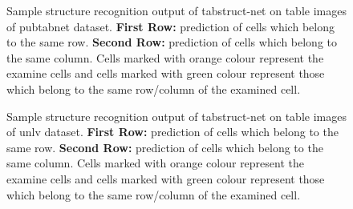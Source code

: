 \documentclass[runningheads]{llncs}
\begin{document}
\begin{figure}
\begin{center}
\hspace{-0.01\textwidth}
\hspace{-0.01\textwidth}
\vspace{0.001\textwidth}
\hspace{-0.01\textwidth}
\hspace{-0.01\textwidth}
\end{center}
\caption{Sample structure recognition output of {\sc t}ab{\sc s}truct-{\sc n}et on table images of {\sc p}ub{\sc t}ab{\sc n}et dataset. \textbf{First Row:} prediction of cells which belong to the same row. \textbf{Second Row:} prediction of cells which belong to the same column. Cells marked with orange colour represent the examine cells and cells marked with green colour represent those which belong to the same row/column of the examined cell.}
\label{fig_pubtabnet_structure}
\end{figure}
\begin{figure}
\begin{center}
\hspace{-0.01\textwidth}
\hspace{-0.01\textwidth}
\vspace{0.001\textwidth}
\hspace{-0.01\textwidth}
\hspace{-0.01\textwidth}
\end{center}
\caption{Sample structure recognition output of {\sc t}ab{\sc s}truct-{\sc n}et on table images of {\sc unlv} dataset. \textbf{First Row:} prediction of cells which belong to the same row. \textbf{Second Row:} prediction of cells which belong to the same column. Cells marked with orange colour represent the examine cells and cells marked with green colour represent those which belong to the same row/column of the examined cell.}
\label{fig_unlv_structure}
\end{figure}
\end{document}
